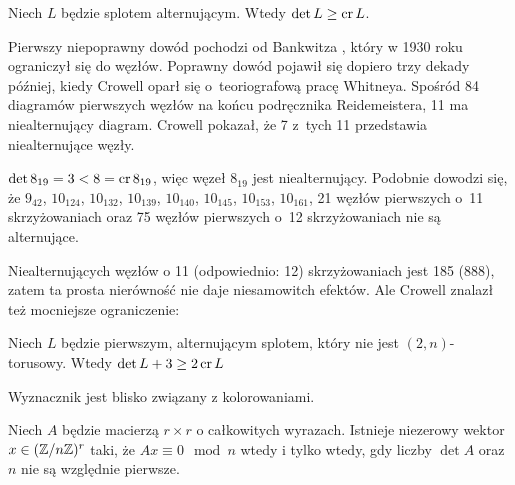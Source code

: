 
\begin{proposition}
%
\label{prp:bankwitz}%
    Niech $L$ będzie splotem alternującym.
    Wtedy $\det L \ge \operatorname{cr} L$.
\end{proposition}

Pierwszy niepoprawny dowód pochodzi od Bankwitza \cite{bankwitz30}, który w 1930 roku ograniczył się do węzłów.
%
Poprawny dowód pojawił się dopiero trzy dekady później, kiedy Crowell \cite{crowell59} oparł się o~teoriografową pracę Whitneya.
%
%
Spośród 84 diagramów pierwszych węzłów na końcu podręcznika Reidemeistera, 11 ma niealternujący diagram.
Crowell pokazał, że 7 z~tych 11 przedstawia niealternujące węzły.

\begin{example}
    $\det 8_{19} = 3 < 8 = \operatorname{cr} 8_{19}$, więc węzeł $8_{19}$ jest niealternujący.
    Podobnie dowodzi się, że $9_{42}$, $10_{124}$, $10_{132}$, $10_{139}$, $10_{140}$, $10_{145}$, $10_{153}$, $10_{161}$, 21 węzłów pierwszych o~11 skrzyżowaniach oraz 75 węzłów pierwszych o~12 skrzyżowaniach nie są alternujące.
\end{example}

Niealternujących węzłów o 11 (odpowiednio: 12) skrzyżowaniach jest 185 (888), zatem ta prosta nierówność nie daje niesamowitch efektów.
Ale Crowell znalazł też mocniejsze ograniczenie:

\begin{proposition}
    Niech $L$ będzie pierwszym, alternującym splotem, który nie jest $(2, n)$-torusowy.
    Wtedy $\det L + 3 \ge 2 \operatorname{cr} L$
\end{proposition}

Wyznacznik jest blisko związany z kolorowaniami.

\begin{lemma}
    Niech $A$ będzie macierzą $r \times r$ o całkowitych wyrazach.
    Istnieje niezerowy wektor $x \in (\mathbb Z/n\mathbb Z)^r$ taki, że $Ax \equiv 0 \mod n$ wtedy i tylko wtedy, gdy liczby $\det A$ oraz $n$ nie są względnie pierwsze.
\end{lemma}

